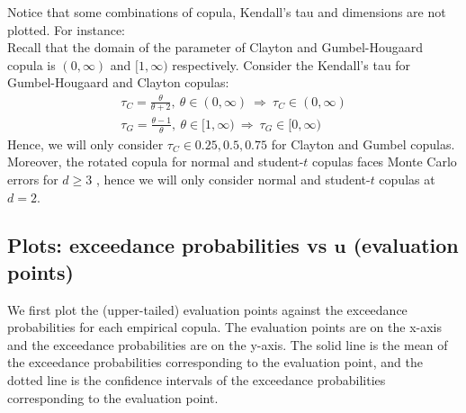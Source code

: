 \documentclass[12pt]{report}
\newcommand{\1}{\mathbf{1}}
\begin{document}
\begin{flushleft}
Notice that some combinations of copula, Kendall's tau and dimensions are not plotted. For instance:\\
\vspace{0.5cm}
Recall that the domain of the parameter of Clayton and Gumbel-Hougaard copula is $(0,\infty)$ and $[1,\infty)$ respectively. Consider the Kendall's tau for Gumbel-Hougaard and Clayton copulas:
\begin{align*}
    \tau_{C} = \frac{\theta}{\theta + 2}, \: \theta \in (0,\infty) \: \Longrightarrow \: \tau_{C} \in (0,\infty) \\
    \tau_{G} = \frac{\theta - 1}{\theta}, \: \theta \in [1,\infty) \: \Longrightarrow \: \tau_{G} \in [0,\infty) 
\end{align*}
Hence, we will only consider $\tau_{C} \in {0.25, 0.5, 0.75}$ for Clayton and Gumbel copulas.\\
\vspace{0.5cm}
Moreover, the rotated copula for normal and student-$t$ copulas faces Monte Carlo errors for $d \ge 3$ \parencite{HofertBook}, hence we will only consider normal and student-$t$ copulas at $d = 2$.
\newpage
\subsection{Plots: exceedance probabilities vs $\textbf{u}$ (evaluation points)}
\vspace{0.5cm}
We first plot the (upper-tailed) evaluation points against the exceedance probabilities for each empirical copula. The evaluation points are on the x-axis and the exceedance probabilities are on the y-axis. The solid line is the mean of the exceedance probabilities corresponding to the evaluation point, and the dotted line is the confidence intervals of the exceedance probabilities corresponding to the evaluation point.


\end{flushleft}
\end{document}
